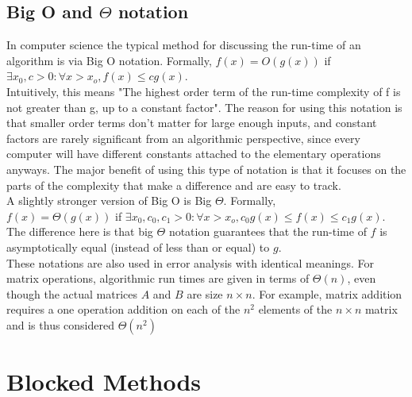 \documentclass{article}         %
\begin{document}
\subsection*{Big O and $\Theta$ notation}
In computer science the typical method for discussing the run-time of an algorithm is via Big O notation. Formally, $f(x)=O(g(x))$ if $\exists x_0, c>0: \forall x>x_o, f(x)\le cg(x)$.\\Intuitively, this means "The highest order term of the run-time complexity of f is not greater than g, up to a constant factor". The reason for using this notation is that smaller order terms don't matter for large enough inputs, and constant factors are rarely significant from an algorithmic perspective, since every computer will have different constants attached to the elementary operations anyways. The major benefit of using this type of notation is that it focuses on the parts of the complexity that make a difference and are easy to track.\\
A slightly stronger version of  Big O is Big $\Theta$. Formally,\\ $f(x)=\Theta(g(x))$ if $\exists x_0, c_0, c_1>0: \forall x>x_o, c_0g(x)\le f(x)\le c_1g(x)$.\\
The difference here is that big $\Theta$ notation guarantees that the run-time of $f$ is asymptotically equal (instead of less than or equal) to $g$.\\
These notations are also used in error analysis with identical meanings.
For matrix operations, algorithmic run times are given in terms of $\Theta(n)$, even though the actual matrices $A$ and $B$ are size $n\times n$. For example, matrix addition requires a one operation addition on each of the $n^2$ elements of the $n\times n$ matrix and is thus considered $\Theta(n^2)$

\section*{Blocked Methods}
\end{document}
